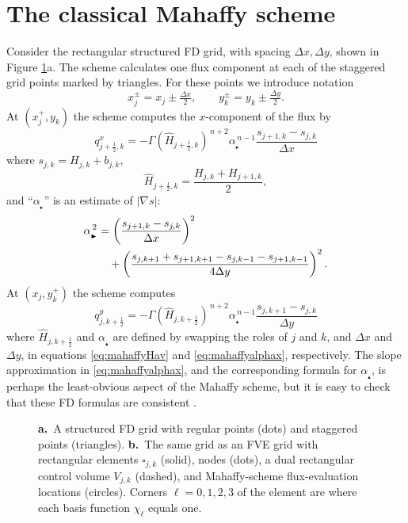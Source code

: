 \documentclass[twocolumn,letterpaper]{igs}
\newcommand{\grad}{\nabla}
\newcommand\alpharight{\alpha_{{}_{\blacktriangleright}}}
\newcommand\alphaup{\alpha_{{\!}_{\blacktriangle}}}
\newcommand{\dxtwo}{\tfrac{\Delta x}{2}}
\newcommand{\dytwo}{\tfrac{\Delta y}{2}}
\newcommand{\half}{\tfrac{1}{2}}
\begin{document}
\section{The classical Mahaffy scheme}   \label{sec:mahaffyfd}

Consider the rectangular structured FD grid, with spacing $\Delta x,\Delta y$, shown in Figure \ref{fig:fdfemgrids}a.  The \cite{Mahaffy1976} scheme calculates one flux component at each of the staggered grid points marked by triangles.  For these points we introduce notation
\begin{equation}
x_j^\pm = x_j \pm \dxtwo, \qquad y_k^\pm = y_k \pm \dytwo. \label{eq:definexypm}
\end{equation}
At $(x_j^+,y_k)$ the scheme computes the $x$-component of the flux by
\begin{equation}
q^x_{j+\half,k} = - \Gamma (\hat H_{j+\half,k})^{\,n+2} \alpharight^{\,n-1} \frac{s_{j+1,k} - s_{j,k}}{\Delta x}  \label{eq:mahaffyqx}
\end{equation}
where $s_{j,k} = H_{j,k} + b_{j,k}$,
\begin{equation}
  \hat H_{j+\half,k} = \frac{H_{j,k} + H_{j+1,k}}{2},  \label{eq:mahaffyHav}
\end{equation}
and ``$\alpharight$\!'' is an estimate of $|\grad s|$:
\begin{align}
\alpharight^{\,2} &= \left(\frac{s_{j+1,k} - s_{j,k}}{\Delta x}\right)^2  \label{eq:mahaffyalphax} \\
  &\quad + \left(\frac{s_{j,k+1} + s_{j+1,k+1} - s_{j,k-1} - s_{j+1,k-1}}{4 \Delta y}\right)^2. \notag
\end{align}
At $(x_j,y_k^+)$ the scheme computes
\begin{equation}
q^y_{j,k+\half} = - \Gamma (\hat H_{j,k+\half})^{\,n+2} \alphaup^{\,n-1} \frac{s_{j,k+1} - s_{j,k}}{\Delta y}  \label{eq:mahaffyqy}
\end{equation}
where $\hat H_{j,k+\half}$ and $\alphaup$ are defined by swapping the roles of $j$ and $k$, and $\Delta x$ and $\Delta y$, in equations \eqref{eq:mahaffyHav} and \eqref{eq:mahaffyalphax}, respectively.  The slope approximation in \eqref{eq:mahaffyalphax}, and the corresponding formula for $\alphaup$, is perhaps the least-obvious aspect of the Mahaffy scheme, but it is easy to check that these FD formulas are consistent \citep{MortonMayers2005}.

\begin{figure}[ht]
\begin{center}
 \quad 
\end{center}
\caption{\textbf{a.}~A structured FD grid with regular points (dots) and staggered points (triangles).  \textbf{b.}~The same grid as an FVE grid with rectangular elements $\square_{j,k}$ (solid), nodes (dots), a dual rectangular control volume $V_{j,k}$ (dashed), and Mahaffy-scheme flux-evaluation locations (circles).  Corners $\ell=0,1,2,3$ of the element are where each basis function $\chi_\ell$ equals one.}
\label{fig:fdfemgrids}
\end{figure}
\end{document}
